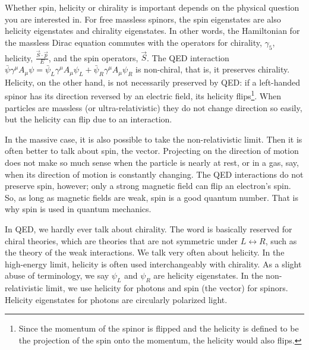 \documentclass[11pt]{article}
\theoremstyle{definition}
\begin{document}
Whether spin, helicity or chirality is important depends on the physical question you are interested in. For free massless spinors, the spin eigenstates are also helicity eigenstates and chirality eigenstates. In other words, the Hamiltonian for the massless Dirac equation commutes with the operators for chirality, \(\gamma_5\), helicity, \(\frac{\vec{S} \cdot \vec{p}}{E}\), and the spin operators, \(\vec{S}\). The QED interaction \(\bar{\psi} \gamma^\mu A_\mu \psi = \bar{\psi}_L \gamma^\mu A_\mu \psi_L + \bar{\psi}_R \gamma^\mu A_\mu \psi_R\) is non-chiral, that is, it preserves chirality. Helicity, on the other hand, is not necessarily preserved by QED: if a left-handed spinor has its direction reversed by an electric field, its helicity flips\footnote{Since the momentum of the spinor is flipped and the helicity is defined to be the projection of the spin onto the momentum, the helicity would also flips.}. When particles are massless (or ultra-relativistic) they do not change direction so easily, but the helicity can flip due to an interaction.

In the massive case, it is also possible to take the non-relativistic limit. Then it is often better to talk about spin, the vector. Projecting on the direction of motion does not make so much sense when the particle is nearly at rest, or in a gas, say, when its direction of motion is constantly changing. The QED interactions do not preserve spin, however; only a strong magnetic field can flip an electron's spin. So, as long as magnetic fields are weak, spin is a good quantum number. That is why spin is used in quantum mechanics.

In QED, we hardly ever talk about chirality. The word is basically reserved for chiral theories, which are theories that are not symmetric under \( L \leftrightarrow R \), such as the theory of the weak interactions. We talk very often about helicity. In the high-energy limit, helicity is often used interchangeably with chirality. As a slight abuse of terminology, we say \( \psi_L \) and \( \psi_R \) are helicity eigenstates. In the non-relativistic limit, we use helicity for photons and spin (the vector) for spinors. Helicity eigenstates for photons are circularly polarized light.
\end{document}
